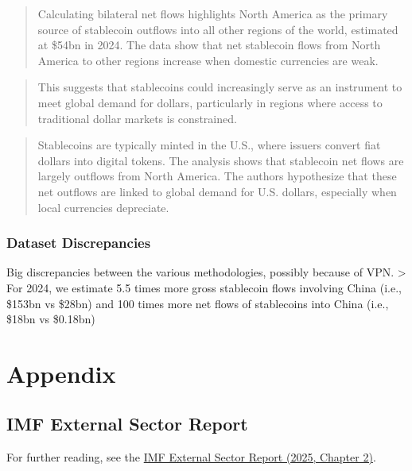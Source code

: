 \documentclass[
  11pt,
]{article}
\begin{document}
\begin{quote}
Calculating bilateral net flows highlights North America as the primary
source of stablecoin outflows into all other regions of the world,
estimated at \$54bn in 2024. The data show that net stablecoin flows
from North America to other regions increase when domestic currencies
are weak.
\end{quote}

\begin{quote}
This suggests that stablecoins could increasingly serve as an instrument
to meet global demand for dollars, particularly in regions where access
to traditional dollar markets is constrained.
\end{quote}

\begin{quote}
Stablecoins are typically minted in the U.S., where issuers convert fiat
dollars into digital tokens. The analysis shows that stablecoin net
flows are largely outflows from North America. The authors hypothesize
that these net outflows are linked to global demand for U.S. dollars,
especially when local currencies depreciate.
\end{quote}

\subsubsection{Dataset Discrepancies}\label{dataset-discrepancies}

Big discrepancies between the various methodologies, possibly because of
VPN. \textgreater{} For 2024, we estimate 5.5 times more gross
stablecoin flows involving China (i.e., \$153bn vs \$28bn) and 100 times
more net flows of stablecoins into China (i.e., \$18bn vs \$0.18bn)

\section{Appendix}\label{appendix}

\subsection{IMF External Sector
Report}\label{imf-external-sector-report}

For further reading, see the
\href{https://www.imf.org/-/media/Files/Publications/ESR/2025/English/ch2.ashx?utm_source}{IMF
External Sector Report (2025, Chapter 2)}.


\printbibliography
\end{document}

